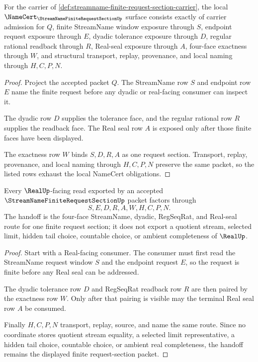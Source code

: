 \begin{theorem}
\label{thm:streamname-finite-request-section-namecert-obligations}
For the carrier of \autoref{def:streamname-finite-request-section-carrier}, the local $\NameCert_{\StreamNameFiniteRequestSectionUp}$ surface consists exactly of carrier admission for $Q$, finite StreamName window exposure through $S$, endpoint request exposure through $E$, dyadic tolerance exposure through $D$, regular rational readback through $R$, Real-seal exposure through $A$, four-face exactness through $W$, and structural transport, replay, provenance, and local naming through $H,C,P,N$.
\end{theorem}
\begin{proof}
Project the accepted packet $Q$. The StreamName row $S$ and endpoint row $E$ name the finite request before any dyadic or real-facing consumer can inspect it.

The dyadic row $D$ supplies the tolerance face, and the regular rational row $R$ supplies the readback face. The Real seal row $A$ is exposed only after those finite faces have been displayed.

The exactness row $W$ binds $S,D,R,A$ as one request section. Transport, replay, provenance, and local naming through $H,C,P,N$ preserve the same packet, so the listed rows exhaust the local NameCert obligations.
\end{proof}

\begin{theorem}
\label{thm:streamname-finite-request-section-real-handoff}
Every $\RealUp$-facing read exported by an accepted $\StreamNameFiniteRequestSectionUp$ packet factors through
$$
S,E,D,R,A,W,H,C,P,N .
$$
The handoff is the four-face StreamName, dyadic, RegSeqRat, and Real-seal route for one finite request section; it does not export a quotient stream, selected limit, hidden tail choice, countable choice, or ambient completeness of $\RealUp$.
\end{theorem}
\begin{proof}
Start with a Real-facing consumer. The consumer must first read the StreamName request window $S$ and the endpoint request $E$, so the request is finite before any Real seal can be addressed.

The dyadic tolerance row $D$ and RegSeqRat readback row $R$ are then paired by the exactness row $W$. Only after that pairing is visible may the terminal Real seal row $A$ be consumed.

Finally $H,C,P,N$ transport, replay, source, and name the same route. Since no coordinate stores quotient stream equality, a selected limit representative, a hidden tail choice, countable choice, or ambient real completeness, the handoff remains the displayed finite request-section packet.
\end{proof}

